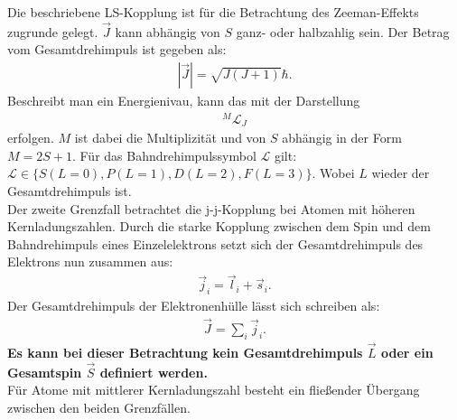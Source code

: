 Die beschriebene LS-Kopplung ist für die Betrachtung des Zeeman-Effekts zugrunde gelegt.
$\vec{J}$ kann abhängig von $S$ ganz- oder halbzahlig sein.
Der Betrag vom Gesamtdrehimpuls ist gegeben als:
\begin{align*}
  |\vec{J}| = \sqrt{J(J+1)}\hbar.
\end{align*}
Beschreibt man ein Energienivau, kann das mit der Darstellung
\begin{align*}
  {}^M\mathcal{L}_J
\end{align*}
erfolgen.
$M$ ist dabei die Multiplizität und von $S$ abhängig in der Form $M=2S+1$.
Für das Bahndrehimpulssymbol $\mathcal{L}$ gilt:
$\mathcal{L}\in\{S(L=0), P(L=1), D(L=2), F(L=3)\}$.
Wobei $L$ wieder der Gesamtdrehimpuls ist.\\
%
Der zweite Grenzfall betrachtet die j-j-Kopplung bei Atomen mit höheren Kernladungszahlen.
Durch die starke Kopplung zwischen dem Spin und dem Bahndrehimpuls eines Einzelelektrons setzt sich der Gesamtdrehimpuls des Elektrons nun zusammen aus:
\begin{align*}
  \vec{j}_i = \vec{l}_i + \vec{s}_i.
\end{align*}
Der Gesamtdrehimpuls der Elektronenhülle lässt sich schreiben als:
\begin{align*}
  \vec{J}=\sum_i\vec{j}_i.
\end{align*}
\textbf{\huge{Es kann bei dieser Betrachtung kein Gesamtdrehimpuls $\vec{L}$ oder ein Gesamtspin $\vec{S}$ definiert werden.}}\\
Für Atome mit mittlerer Kernladungszahl besteht ein fließender Übergang zwischen den beiden Grenzfällen.
\FloatBarrier

